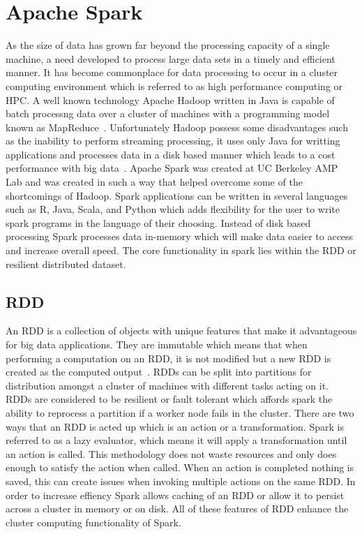\section{Apache Spark}

As the size of data has grown far beyond the processing capacity of a
single machine, a need developed to process large data sets in a
timely and efficient manner.  It has become commonplace for data
processing to occur in a cluster computing environment which is
referred to as high performance computing or HPC.  A well known
technology Apache Hadoop written in Java is capable of batch processng
data over a cluster of machines with a programming model known as
MapReduce~\cite{www-hadoop}.  Unfortunately Hadoop possess some
disadvantages such as the inability to perform streaming processing,
it uses only Java for writting applications and processes data in a
disk based manner which leads to a cost performance with big
data~\cite{www-aaspark}.  Apache Spark was created at UC Berkeley AMP
Lab and was created in such a way that helped overcome some of the
shortcomings of Hadoop.  Spark applications can be written in several
languages such as R, Java, Scala, and Python which adds flexibility
for the user to write spark programs in the language of their
choosing.  Instead of disk based processing Spark processes data
in-memory which will make data easier to access and increase overall
speed.  The core functionality in spark lies within the RDD or
resilient distributed dataset.

\subsection{RDD}
An RDD is a collection of objects with unique features that make it
advantageous for big data applications.  They are immutable which
means that when performing a computation on an RDD, it is not modified
but a new RDD is created as the computed output~\cite{www-hpspark}.
RDDs can be split into partitions for distribution amongst a cluster
of machines with different tasks acting on it. RDDs are considered to
be resilient or fault tolerant which affords spark the ability to
reprocess a partition if a worker node fails in the cluster.  There
are two ways that an RDD is acted up which is an action or a
transformation.  Spark is referred to as a lazy evaluator, which means
it will apply a transformation until an action is called.  This
methodology does not waste resources and only does enough to satisfy
the action when called.  When an action is completed nothing is saved,
this can create issues when invoking multiple actions on the same RDD.
In order to increase effiency Spark allows caching of an RDD or allow
it to persist across a cluster in memory or on disk.  All of these
features of RDD enhance the cluster computing functionality of Spark.


